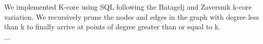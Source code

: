 We implemented K-core using SQL following the Batagelj and Zaversnik k-core variation. We recursively prune the nodes and edges in the graph with degree less than k to finally arrive at points of degree greater than or equal to k. 


$\ldots$

